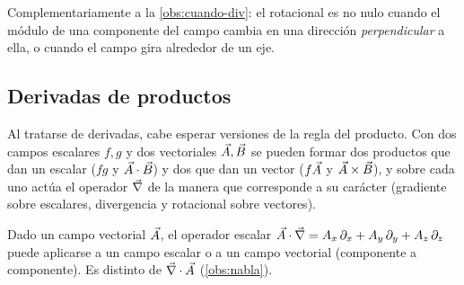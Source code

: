 \begin{observacion}\label{obs:cuando-rot}
Complementariamente a la \cref{obs:cuando-div}: el rotacional es no nulo
cuando el módulo de una componente del campo cambia en una dirección
\emph{perpendicular} a ella, o cuando el campo gira alrededor de un eje.
\end{observacion}



\subsection{Derivadas de productos}\label{sec:productos}
Al tratarse de derivadas, cabe esperar versiones de la regla del producto.
Con dos campos escalares $f,g$ y dos vectoriales $\vec{A},\vec{B}$ se pueden
formar dos productos que dan un escalar ($fg$ y $\vec{A}\cdot\vec{B}$) y dos que
dan un vector ($f\vec{A}$ y $\vec{A}\times\vec{B}$), y sobre cada uno actúa el
operador $\vec{\nabla}$ de la manera que corresponde a su carácter (gradiente sobre
escalares, divergencia y rotacional sobre vectores).

\begin{notacion}\label{not:A-nabla}
Dado un campo vectorial $\vec{A}$, el operador escalar
$\vec{A}\cdot\vec{\nabla}=A_x\,\partial_x+A_y\,\partial_y+A_z\,\partial_z$ puede aplicarse
a un campo escalar o a un campo vectorial (componente a componente). Es distinto
de $\vec{\nabla}\cdot\vec{A}$ (\cref{obs:nabla}).
\end{notacion}

